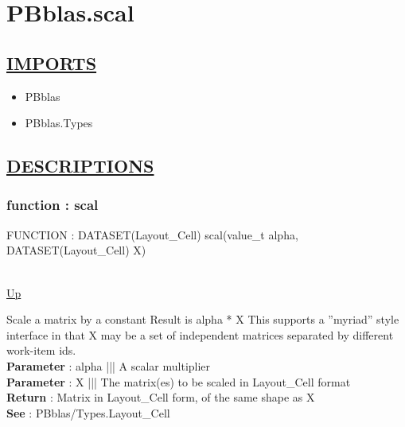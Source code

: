 \chapter*{PBblas.scal}
\hypertarget{PBblas.scal}{}

\section*{\underline{IMPORTS}}
\begin{itemize}
\item PBblas
\item PBblas.Types
\end{itemize}

\section*{\underline{DESCRIPTIONS}}
\subsection*{function : scal}
\hypertarget{ecldoc:pbblas.scal}{FUNCTION : DATASET(Layout\_Cell) scal(value\_t alpha, DATASET(Layout\_Cell) X)} \\
\hyperlink{ecldoc:}{Up} \\
\par
Scale a matrix by a constant Result is alpha * X This supports a ''myriad'' style interface in that X may be a set of independent matrices separated by different work-item ids. \\
\textbf{Parameter} : alpha ||| A scalar multiplier \\
\textbf{Parameter} : X ||| The matrix(es) to be scaled in Layout\_Cell format \\
\textbf{Return} : Matrix in Layout\_Cell form, of the same shape as X \\
\textbf{See} : PBblas/Types.Layout\_Cell \\
